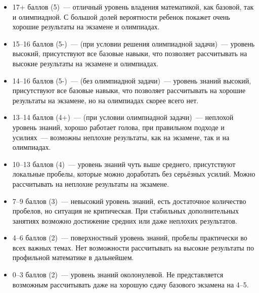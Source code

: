
\begin{itemize}
    \item 17+ баллов (5) — отличный уровень владения математикой, как базовой, так и олимпиадной. С большой долей вероятности ребенок покажет очень хорошие результаты на экзамене и олимпиадах.
    \item 15--16 баллов (5-) — (при условии решения олимпиадной задачи) — уровень высокий, присутствуют все базовые навыки, что позволяет рассчитывать на высокие результаты на экзамене и олимпиадах.
    \item 14--16 баллов (5-) — (без олимпиадной задачи) — уровень знаний высокий, присутствуют все базовые навыки, что позволяет рассчитывать на хорошие результаты на экзамене, но на олимпиадах скорее всего нет.
    \item 13--14 баллов (4+) — (при условии олимпиадной задачи) — неплохой уровень знаний, хорошо работает голова, при правильном подходе и усилиях — возможны неплохие результаты, как на экзамене, так и на олимпиадах.
    \item 10--13 баллов (4) — уровень знаний чуть выше среднего, присутствуют локальные пробелы, которые можно доработать без серьёзных усилий. Можно рассчитывать на неплохие результаты на экзамене.
    \item 7--9 баллов (3) — невысокий уровень знаний, есть достаточное количество пробелов, но ситуация не критическая. При стабильных дополнительных занятиях возможно достижение средних или даже неплохих результатов.
    \item 4--6 баллов (2) — поверхностный уровень знаний, пробелы практически во всех важных темах. Нет возможности рассчитывать на высокие результаты по профильной математике в дальнейшем.
    \item 0--3 баллов (2) — уровень знаний околонулевой. Не представляется возможным рассчитывать даже на хорошую сдачу базового экзамена на 4--5.
\end{itemize}